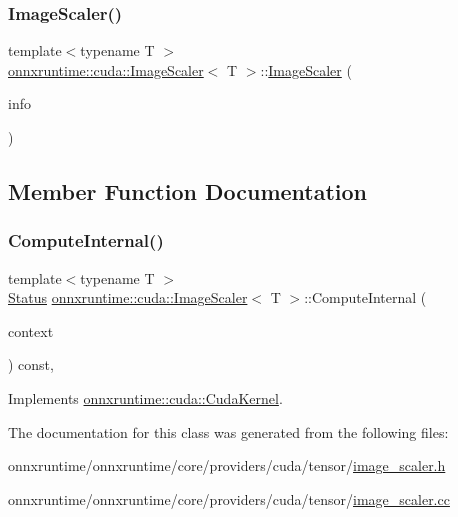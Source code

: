 \subsubsection{\texorpdfstring{Image\+Scaler()}{ImageScaler()}}
{\footnotesize\ttfamily template$<$typename T $>$ \\
\mbox{\hyperlink{classonnxruntime_1_1cuda_1_1ImageScaler}{onnxruntime\+::cuda\+::\+Image\+Scaler}}$<$ T $>$\+::\mbox{\hyperlink{classonnxruntime_1_1cuda_1_1ImageScaler}{Image\+Scaler}} (\begin{DoxyParamCaption}\item[{const \mbox{\hyperlink{classonnxruntime_1_1OpKernelInfo}{Op\+Kernel\+Info}} \&}]{info }\end{DoxyParamCaption})}



\subsection{Member Function Documentation}
\mbox{\label{classonnxruntime_1_1cuda_1_1ImageScaler_a151b80890690ab2caeb3285593a09e0e}} 
\subsubsection{\texorpdfstring{Compute\+Internal()}{ComputeInternal()}}
{\footnotesize\ttfamily template$<$typename T $>$ \\
\mbox{\hyperlink{classonnxruntime_1_1common_1_1Status}{Status}} \mbox{\hyperlink{classonnxruntime_1_1cuda_1_1ImageScaler}{onnxruntime\+::cuda\+::\+Image\+Scaler}}$<$ T $>$\+::Compute\+Internal (\begin{DoxyParamCaption}\item[{\mbox{\hyperlink{classonnxruntime_1_1OpKernelContext}{Op\+Kernel\+Context}} $\ast$}]{context }\end{DoxyParamCaption}) const\hspace{0.3cm}{\ttfamily [override]}, {\ttfamily [virtual]}}



Implements \mbox{\hyperlink{classonnxruntime_1_1cuda_1_1CudaKernel_aca7af04ae448017d6023d30bba231ebb}{onnxruntime\+::cuda\+::\+Cuda\+Kernel}}.



The documentation for this class was generated from the following files\+:\begin{DoxyCompactItemize}
\item 
onnxruntime/onnxruntime/core/providers/cuda/tensor/\mbox{\hyperlink{cuda_2tensor_2image__scaler_8h}{image\+\_\+scaler.\+h}}\item 
onnxruntime/onnxruntime/core/providers/cuda/tensor/\mbox{\hyperlink{cuda_2tensor_2image__scaler_8cc}{image\+\_\+scaler.\+cc}}\end{DoxyCompactItemize}
